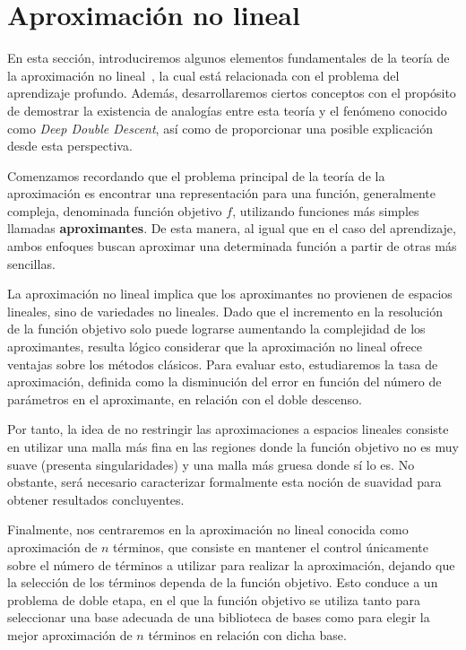 \section{Aproximación no lineal}\label{sec:aproximacion-no-lineal}

En esta sección, introduciremos algunos elementos fundamentales de la teoría de la aproximación no lineal~\cite{DeVore1998}, la cual está relacionada con el problema del aprendizaje profundo. Además, desarrollaremos ciertos conceptos con el propósito de demostrar la existencia de analogías entre esta teoría y el fenómeno conocido como \textit{Deep Double Descent}, así como de proporcionar una posible explicación desde esta perspectiva.

Comenzamos recordando que el problema principal de la teoría de la aproximación es encontrar una representación para una función, generalmente compleja, denominada función objetivo $f$, utilizando funciones más simples llamadas \textbf{aproximantes}. De esta manera, al igual que en el caso del aprendizaje, ambos enfoques buscan aproximar una determinada función a partir de otras más sencillas.

La aproximación no lineal implica que los aproximantes no provienen de espacios lineales, sino de variedades no lineales. Dado que el incremento en la resolución de la función objetivo solo puede lograrse aumentando la complejidad de los aproximantes, resulta lógico considerar que la aproximación no lineal ofrece ventajas sobre los métodos clásicos. Para evaluar esto, estudiaremos la tasa de aproximación, definida como la disminución del error en función del número de parámetros en el aproximante, en relación con el doble descenso.

Por tanto, la idea de no restringir las aproximaciones a espacios lineales consiste en utilizar una malla más fina en las regiones donde la función objetivo no es muy suave (presenta singularidades) y una malla más gruesa donde sí lo es. No obstante, será necesario caracterizar formalmente esta noción de suavidad para obtener resultados concluyentes.

Finalmente, nos centraremos en la aproximación no lineal conocida como aproximación de $n$ términos, que consiste en mantener el control únicamente sobre el número de términos a utilizar para realizar la aproximación, dejando que la selección de los términos dependa de la función objetivo. Esto conduce a un problema de doble etapa, en el que la función objetivo se utiliza tanto para seleccionar una base adecuada de una biblioteca de bases como para elegir la mejor aproximación de $n$ términos en relación con dicha base.

